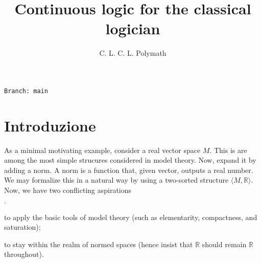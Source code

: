 \documentclass[11pt,oneside]{amsart}
\author{C. L. C. L. Polymath}
\newcommand{\mylabel}[1]{{#1}\hfill}
\renewenvironment{itemize}
  {\begin{list}{$\cdot$}{%
  \setlength{\parskip}{0mm}
  \setlength{\topsep}{.2\baselineskip}
  \setlength{\rightmargin}{0mm}
  \setlength{\listparindent}{0mm}
  \setlength{\itemindent}{0mm}
  \setlength{\labelwidth}{3ex}
  \setlength{\itemsep}{.2\baselineskip}
  \setlength{\parsep}{.2\baselineskip}
  \setlength{\partopsep}{0mm}
  \setlength{\labelsep}{1ex}
  \setlength{\leftmargin}{\labelwidth+\labelsep}
  \let\makelabel\mylabel}}{%
\end{list}}
\begin{document}
\title{Continuous logic for the classical logician}
\hfill\texttt{Branch:\ main\ \DTMnow}\bigskip
\maketitle
\raggedbottom

\def\forallM{\forall\raisebox{1.1ex}{\scaleto{\sf M}{.8ex}\kern-.2ex}}
\def\existsM{\exists\raisebox{1.1ex}{\scaleto{\sf M}{.8ex}\kern-.2ex}}
\def\forallR{\forall\raisebox{1.1ex}{\scaleto{\sf R}{.8ex}\kern-.2ex}}
\def\existsR{\exists\raisebox{1.1ex}{\scaleto{\sf R}{.8ex}\kern-.2ex}}

\newcommand\questionsign[1][2ex]{%
  \renewcommand\stacktype{L}%
  \scaleto{\stackon[-.6pt]{\color{red}$\triangle$}{\color{red}\bfseries\small ?}}{#1}%
}

\newcommand\dangersign[1][2ex]{%
  \renewcommand\stacktype{L}%
  \scaleto{\stackon[-.6pt]{\color{red}$\triangle$}{\color{red}\bfseries\small !}}{#1}%
}


\section{Introduzione}\label{intro}


\def\ceq#1#2#3{\parbox[t]{23ex}{$\displaystyle #1$}\parbox{6ex}{\hfil $#2$}{$\displaystyle #3$}}

As a minimal motivating example, consider a real vector space $M$.
This is are among the most simple strucures considered in model theory.
Now, expand it by adding a norm.
A norm is a function that, given vector, outputs a real number.
We may formalize this in a natural way by using a two-sorted structure $\langle M,\mathds{R}\rangle$.
Now, we have two conflicting aspirations
\begin{itemize}
  \item[i.] to apply the basic tools of model theory (such as elementarity, compactness, and saturation);
  \item[ii.] to stay within the realm of normed spaces (hence insist that 
  $\mathds{R}$ should remain $\mathds{R}$ throughout).
\end{itemize}
\end{document}
